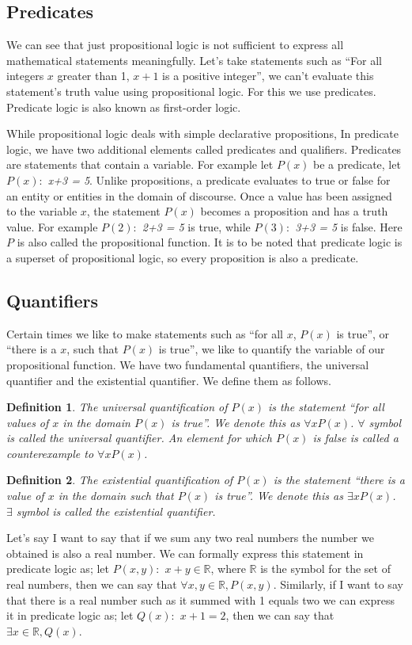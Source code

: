 \documentclass[12pt]{exam}
\newtheorem{definition}{Definition}
\begin{document}
\subsection*{Predicates}
We can see that just propositional logic is not sufficient to express all mathematical statements meaningfully.
Let's take statements such as ``For all integers $x$ greater than 1, $x+1$ is a positive integer'', we can't evaluate this statement's truth value using propositional logic.
For this we use predicates. Predicate logic is also known as first-order logic.

While propositional logic deals with simple declarative propositions, 
In predicate logic, we have two additional elements called predicates and qualifiers.
Predicates are statements that contain a variable. For example let $P(x)$ be a predicate, let \emph{$P(x):$ x+3 = 5}.
Unlike propositions, a predicate evaluates to true or false for an entity or entities in the domain of discourse.
Once a value has been assigned to the variable $x$, the statement $P(x)$ becomes a proposition and has a truth value.
For example \emph{$P(2):$ 2+3 = 5} is true, while \emph{$P(3):$ 3+3 = 5} is false. Here $P$ is also called the propositional function.
It is to be noted that predicate logic is a superset of propositional logic, so every proposition is also a predicate.

\subsection*{Quantifiers}
Certain times we like to make statements such as ``for all $x$, $P(x)$ is true'', or ``there is a $x$, such that $P(x)$ is true'', we like to quantify the variable of our propositional function.
We have two fundamental quantifiers, the universal quantifier and the existential quantifier. We define them as follows.
\begin{definition}
    The universal quantification of $P(x)$ is the statement ``for all values of $x$ in the domain $P(x)$ is true''.
    We denote this as $\forall x P(x)$. $\forall$ symbol is called the universal quantifier. 
    An element for which $P(x)$ is false is called a counterexample to $\forall xP(x)$.
\end{definition}
\begin{definition}
    The existential quantification of $P(x)$ is the statement ``there is a value of $x$ in the domain such that $P(x)$ is true''.
    We denote this as $\exists x P(x)$. $\exists$ symbol is called the existential quantifier. 
\end{definition}
Let's say I want to say that if we sum any two real numbers the number we obtained is also a real number. 
We can formally express this statement in predicate logic as; let \emph{$P(x,y) :$ $x+y \in \mathbb{R}$}, where $\mathbb{R}$ is the symbol for the set of real numbers, then we can say that $\forall x,y \in \mathbb{R}, P(x,y)$.
Similarly, if I want to say that there is a real number such as it summed with 1 equals two we can express it in predicate logic as; let \emph{$Q(x):$ $x+1 = 2$}, then we can say that $\exists x \in \mathbb{R}, Q(x)$.
\end{document}
